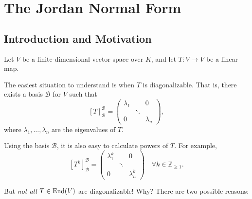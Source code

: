 \renewcommand{\thetheorem}{28.a.\arabic{theorem}}
\setcounter{theorem}{0}
\setcounter{chapter}{27}

\chapter{The Jordan Normal Form}

\section{Introduction and Motivation}

Let $V$ be a finite-dimensional vector space over $K$, and let $T \colon V \to V$ be a linear map.

The easiest situation to understand is when $T$ is diagonalizable. That is, there exists a basis $\mathcal{B}$ for $V$ such that 
\[
[T]_{\mathcal{B}}^{\mathcal{B}} = \begin{pmatrix} \lambda_1 & & 0 \\ & \ddots & \\ 0 & & \lambda_n \end{pmatrix},
\]
where $\lambda_1, \dots, \lambda_n$ are the eigenvalues of $T$.

Using the basis $\mathcal{B}$, it is also easy to calculate powers of $T$. For example, 
\[
[T^k]_{\mathcal{B}}^{\mathcal{B}} = \begin{pmatrix} \lambda_1^k & & 0 \\ & \ddots & \\ 0 & & \lambda_n^k \end{pmatrix} \quad \forall k \in \mathbb{Z}_{\ge 1}.
\]

But \emph{not all} $T \in \operatorname{End}(V)$ are diagonalizable! Why? There are two possible reasons:

